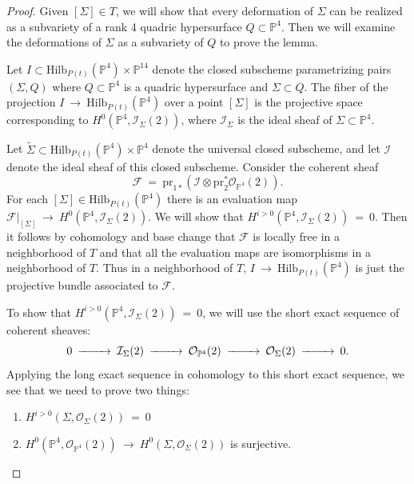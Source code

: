 \documentclass[twoside,12pt,reqno]{amsart}
\theoremstyle{plain}
\theoremstyle{definition}
\newcommand{\PP}{\mathbb{P}}
\def\ps{\vspace{4pt}}
\newcommand{\OO}{\mathcal O}
\begin{document}
\begin{proof}
Given $[\Sigma]\in T$, we will show that every deformation of $\Sigma$
can be realized as a subvariety of a rank 4 quadric hypersurface
$Q\subset\PP^4$.  Then we will examine the deformations of $\Sigma$ as
a subvariety of $Q$ to prove the lemma.

\ps

Let $I\subset \text{Hilb}_{P(t)}(\PP^4)\times \PP^{14}$ denote the
closed subscheme parametrizing pairs $(\Sigma,Q)$ where $Q\subset
\PP^4$ is a quadric hypersurface and $\Sigma\subset Q$.  The fiber of
the projection $I~\rightarrow~ \text{Hilb}_{P(t)}(\PP^4)$ over a
point $[\Sigma]$ is the projective space corresponding to
$H^0(\PP^4,\mathcal{I}_\Sigma(2))$, where $\mathcal{I}_\Sigma$ is the
ideal sheaf of $\Sigma\subset \PP^4$.  

\ps

Let $\widetilde{\Sigma}\subset \text{Hilb}_{P(t)}(\PP^4)\times \PP^4$
denote the universal closed subscheme, and let $\mathcal{I}$ denote the
ideal sheaf of this closed subscheme.  Consider the coherent sheaf
\begin{equation}\mathcal{F} ~=~
\text{pr}_{1*}(\mathcal{I}\otimes\text{pr}_2^*\OO_{\PP^4}(2)).\end{equation} 
For each $[\Sigma]\in \text{Hilb}_{P(t)}(\PP^4)$ there is an
evaluation map $\mathcal{F}|_{[\Sigma]} ~\rightarrow~
H^0(\PP^4,\mathcal{I}_{\Sigma}(2))$.  We will show that
$H^{i>0}(\PP^4,\mathcal{I}_{\Sigma}(2)) ~=~ 0$.  Then it follows by cohomology
and base change \cite[theorem III.12.11]{H} that $\mathcal{F}$ is locally free
in a neighborhood of $T$ and that all the evaluation maps are
isomorphisms in a neighborhood of $T$.  Thus in a neighborhood of $T$,
$I~\rightarrow~ \text{Hilb}_{P(t)}(\PP^4)$ is just the projective bundle
associated to $\mathcal{F}$.  

\ps

To show that $H^{i>0}(\PP^4,\mathcal{I}_{\Sigma}(2)) ~=~ 0$, we will use the short
exact sequence of coherent sheaves:
\begin{equation}\begin{CD}
0 @>>> \mathcal{I}_{\Sigma}(2) @>>> \OO_{\PP^4}(2) @>>> \OO_{\Sigma}(2) @>>> 0.
\end{CD}\end{equation}
Applying the long exact sequence in cohomology to this short exact
sequence, we see that we need to prove two things:
\begin{enumerate}
\item $H^{i>0}(\Sigma,\OO_{\Sigma}(2)) ~=~ 0$
\item $H^0(\PP^4,\OO_{\PP^4}(2)) ~\rightarrow~
H^0(\Sigma,\OO_{\Sigma}(2))$ is surjective.
\end{enumerate}


\end{proof}
\end{document}
